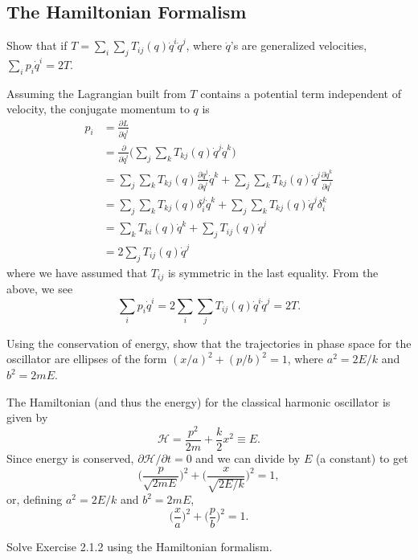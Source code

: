 \documentclass[../principles-of-quantum-mechanics.tex]{subfiles}
\begin{document}
\begin{questions}
		\subsection{The Hamiltonian Formalism}
		\question Show that if $T = \sum_i\sum_j{T_{ij}}(q)\dot{q}^i\dot{q}^j$, where $\dot{q}$'s are generalized velocities, $\sum_ip_i\dot{q}^i=2T$.
		\begin{solution}
			Assuming the Lagrangian built from $T$ contains a potential term independent of velocity, the conjugate momentum to $q$ is
			\begin{align*}
				p_i &= \frac{\partial{L}}{\partial{\dot{q}^i}} \\
				&= \frac{\partial}{\partial{\dot{q}^i}}\Big(\sum_j\sum_kT_{kj}(q)\dot{q}^j\dot{q}^k\Big) \\
				&= \sum_j\sum_kT_{kj}(q)\frac{\partial{\dot{q}^j}}{\partial{\dot{q}^i}}\dot{q}^k + \sum_j\sum_kT_{kj}(q)\dot{q}^j\frac{\partial{\dot{q}^k}}{\partial{\dot{q}^i}} \\
				&= \sum_j\sum_kT_{kj}(q)\delta^j_i\dot{q}^k + \sum_j\sum_kT_{kj}(q)\dot{q}^j\delta^k_i \\
				&= \sum_kT_{ki}(q)\dot{q}^k + \sum_jT_{ij}(q)\dot{q}^j \\
				&= 2\sum_jT_{ij}(q)\dot{q}^j
			\end{align*}
			where we have assumed that $T_{ij}$ is symmetric in the last equality. From the above, we see
			\[
				\sum_ip_i\dot{q}^i = 2\sum_i\sum_jT_{ij}(q)\dot{q}^i\dot{q}^j = 2T.
			\]
		\end{solution}
	
		\question Using the conservation of energy, show that the trajectories in phase space for the oscillator are ellipses of the form $(x/a)^2 + (p/b)^2 = 1$, where $a^2 = 2E/k$ and $b^2 = 2mE$.
		
		\begin{solution}
			The Hamiltonian (and thus the energy) for the classical harmonic oscillator is given by
			\[
				\mathcal{H} = \frac{p^2}{2m} + \frac{k}{2}x^2 \equiv E.
			\]
			Since energy is conserved, $\partial\mathcal{H}/\partial{t} = 0$ and we can divide by $E$ (a constant) to get
			\[
				\Big(\frac{p}{\sqrt{2mE}}\Big)^2 + \Big(\frac{x}{\sqrt{2E/k}}\Big)^2 = 1,
			\]
			or, defining $a^2 = 2E/k$ and $b^2 = 2mE$,
			\[
				\Big(\frac{x}{a}\Big)^2 + \Big(\frac{p}{b}\Big)^2 = 1.
			\]
		\end{solution}
		
		\question Solve Exercise 2.1.2 using the Hamiltonian formalism.
		

\end{questions}
\end{document}
